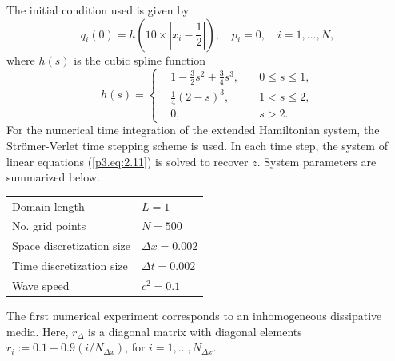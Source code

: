 The initial condition used is given by
\begin{equation} \label{p3.eq:4.5}
	q_i(0) = h( 10\times|x_i - \frac{1}{2}| ), \quad p_i = 0, \quad i=1,\dots,N,
\end{equation}
where $h(s)$ is the cubic spline function
\begin{equation} \label{p3.eq:4.6}
h(s) = 
\left\{
\begin{aligned}
& 1 - \frac{3}{2}s^2 + \frac{3}{4}s^3, \quad & 0\leq s \leq 1, \\
& \frac{1}{4}(2-s)^3, & 1< s \leq 2, \\
& 0, & s > 2.
\end{aligned}
\right.
\end{equation}
For the numerical time integration of the extended Hamiltonian system, the Str\"omer-Verlet time stepping scheme  is used. In each time step, the system of linear equations (\ref{p3.eq:2.11}) is solved to recover $z$. System parameters are summarized below.
\vspace{0.5cm}
\begin{center}
\begin{tabular}{|l|l|}
\hline
Domain length & $L = 1$ \\
No. grid points & $N = 500$ \\
Space discretization size & $\Delta x = 0.002$ \\
Time discretization size & $\Delta t = 0.002$ \\
Wave speed & $c^2 = 0.1$ \\
\hline
\end{tabular}
\end{center}
\vspace{0.5cm}
The first numerical experiment corresponds to an inhomogeneous dissipative media. Here, $r_{\Delta}$ is a diagonal matrix with diagonal elements $r_i := 0.1 + 0.9(i/N_{\Delta x})$, for $i=1,\dots,N_{\Delta x}$.


